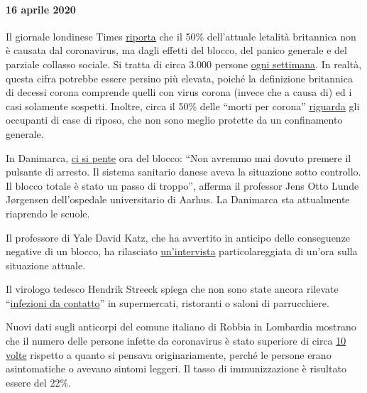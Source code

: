 \hypertarget{16-aprile-2020}{%
\paragraph{16 aprile 2020}\label{16-aprile-2020}}

Il giornale londinese Times \href{https://archive.is/2eKCW}{riporta} che
il 50\% dell'attuale letalità britannica non è causata dal coronavirus,
ma dagli effetti del blocco, del panico generale e del parziale collasso
sociale. Si tratta di circa 3.000 persone
\href{https://www.ons.gov.uk/peoplepopulationandcommunity/birthsdeathsandmarriages/deaths/bulletins/deathsregisteredweeklyinenglandandwalesprovisional/weekending3april2020}{ogni
settimana}. In realtà, questa cifra potrebbe essere persino più elevata,
poiché la definizione britannica di decessi corona comprende quelli con
virus corona (invece che a causa di) ed i casi solamente sospetti.
Inoltre, circa il 50\% delle ``morti per corona''
\href{https://ltccovid.org/2020/04/12/mortality-associated-with-covid-19-outbreaks-in-care-homes-early-international-evidence/}{riguarda}
gli occupanti di case di riposo, che non sono meglio protette da un
confinamento generale.

In Danimarca,
\href{https://jyllands-posten.dk/debat/breve/ECE12074246/vi-skulle-aldrig-have-trykket-paa-stopknappen/}{ci
si pente} ora del blocco: ``Non avremmo mai dovuto premere il pulsante
di arresto. Il sistema sanitario danese aveva la situazione sotto
controllo. Il blocco totale è stato un passo di troppo'', afferma il
professor Jens Otto Lunde Jørgensen dell'ospedale universitario di
Aarhus. La Danimarca sta attualmente riaprendo le scuole.

Il professore di Yale David Katz, che ha avvertito in anticipo delle
conseguenze negative di un blocco, ha rilasciato
\href{https://www.youtube.com/watch?v=VK0Wtjh3HVA}{un'intervista}
particolareggiata di un'ora sulla situazione attuale.

Il virologo tedesco Hendrik Streeck spiega che non sono state ancora
rilevate
``\href{https://today.rtl.lu/news/science-and-environment/a/1498185.html}{infezioni
da contatto}'' in supermercati, ristoranti o saloni di parrucchiere.

Nuovi dati sugli anticorpi del comune italiano di Robbia in Lombardia
mostrano che il numero delle persone infette da coronavirus è stato
superiore di circa
\href{https://www.tgcom24.mediaset.it/cronaca/a-robbio-pv-il-22-ha-o-ha-avuto-il-coronavirus-ok-del-sindaco-ai-test-per-tutti_17285128-202002a.shtml}{10
volte} rispetto a quanto si pensava originariamente, perché le persone
erano asintomatiche o avevano sintomi leggeri. Il tasso di
immunizzazione è risultato essere del 22\%.

